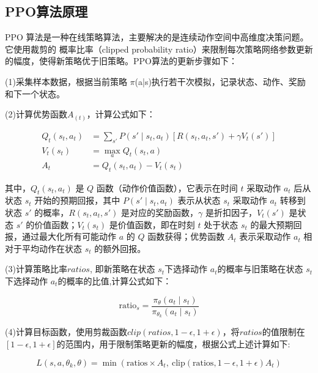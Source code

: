 \subsection{PPO算法原理 }

PPO 算法是一种在线策略算法，主要解决的是连续动作空间中高维度决策问题。它使用裁剪的
概率比率（clipped probability ratio）来限制每次策略网络参数更新的幅度，使得新策略优于旧策略。PPO算法的更新步骤如下\cite{JSJJ20250416003}：

(1)采集样本数据，根据当前策略 $\pi$(a|s)执行若干次模拟，记录状态、动作、奖励和下一个状态。

(2)计算优势函数$𝐴_(t)$，计算公式如下：

\begin{align}
	Q_t(s_t, a_t) &= \sum_{s'} P(s' \mid s_t, a_t) \left[ R(s_t, a_t, s') + \gamma V_t(s') \right] \\
	V_t(s_t) &= \max_a Q_t(s_t, a) \\
	A_t &= Q_t(s_t, a_t) - V_t(s_t)
\end{align}

其中，\( Q_t(s_t, a_t) \) 是 \( Q \) 函数（动作价值函数），它表示在时间 \( t \) 采取动作 \( a_t \) 后从状态 \( s_t \) 开始的预期回报，其中 \( P(s' \mid s_t, a_t) \) 表示从状态 \( s_t \) 采取动作 \( a_t \) 转移到状态 \( s' \) 的概率，\( R(s_t, a_t, s') \) 是对应的奖励函数，\( \gamma \) 是折扣因子，\( V_t(s') \) 是状态 \( s' \) 的价值函数；\( V_t(s_t) \) 是价值函数，即在时刻 \( t \) 处于状态 \( s_t \) 的最大预期回报，通过最大化所有可能动作 \( a \) 的 \( Q \) 函数获得；优势函数 \( A_t \) 表示采取动作 \( a_t \) 相对于平均动作在状态 \( s_t \) 的额外回报。

(3)计算策略比率\(ratios\), 即新策略在状态 \( s_t \)下选择动作 \( a_t \)的概率与旧策略在状态 \( s_t \)下选择动作 \( a_t \)的概率的比值,计算公式如下：

\begin{equation}
	\text{ratio}_s = \frac{\pi_\theta(a_t \mid s_t)}{\pi_{\theta_k}(a_t \mid s_t)}
\end{equation}

(4)计算目标函数，使用剪裁函数\(𝑐𝑙𝑖𝑝(𝑟𝑎𝑡𝑖𝑜𝑠, 1 − 𝜖, 1 + 𝜖)\)，将\(ratios\)的值限制在\([1 − 𝜖, 1 + 𝜖]\)的范围内，用于限制策略更新的幅度，根据公式上述计算如下:

\begin{equation}
	L(s, a, \theta_k, \theta) = \min\left( \text{ratios} \times A_t, \ \text{clip}\left( \text{ratios}, 1 - \epsilon, 1 + \epsilon \right) A_t \right)
\end{equation}

